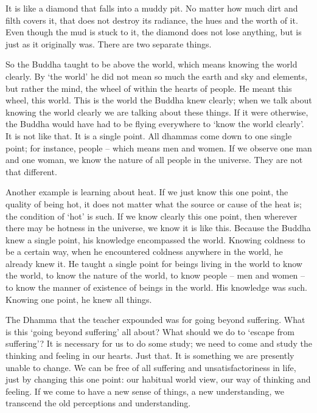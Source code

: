 It is like a diamond that falls into a muddy pit. No matter how much dirt and filth covers it, that does not destroy its radiance, the hues and the worth of it. Even though the mud is stuck to it, the diamond does not lose anything, but is just as it originally was. There are two separate things. 

So the Buddha taught to be above the world, which means knowing the world clearly. By `the world' he did not mean so much the earth and sky and elements, but rather the mind, the wheel of  within the hearts of people. He meant this wheel, this world. This is the world the Buddha knew clearly; when we talk about knowing the world clearly we are talking about these things. If it were otherwise, the Buddha would have had to be flying everywhere to `know the world clearly'. It is not like that. It is a single point. All dhammas come down to one single point; for instance, people -- which means men and women. If we observe one man and one woman, we know the nature of all people in the universe. They are not that different. 

Another example is learning about heat. If we just know this one point, the quality of being hot, it does not matter what the source or cause of the heat is; the condition of `hot' is such. If we know clearly this one point, then wherever there may be hotness in the universe, we know it is like this. Because the Buddha knew a single point, his knowledge encompassed the world. Knowing coldness to be a certain way, when he encountered coldness anywhere in the world, he already knew it. He taught a single point for beings living in the world to know the world, to know the nature of the world, to know people -- men and women -- to know the manner of existence of beings in the world. His knowledge was such. Knowing one point, he knew all things. 

The Dhamma that the teacher expounded was for going beyond suffering. What is this `going beyond suffering' all about? What should we do to `escape from suffering'? It is necessary for us to do some study; we need to come and study the thinking and feeling in our hearts. Just that. It is something we are presently unable to change. We can be free of all suffering and unsatisfactoriness in life, just by changing this one point: our habitual world view, our way of thinking and feeling. If we come to have a new sense of things, a new understanding, we transcend the old perceptions and understanding. 

